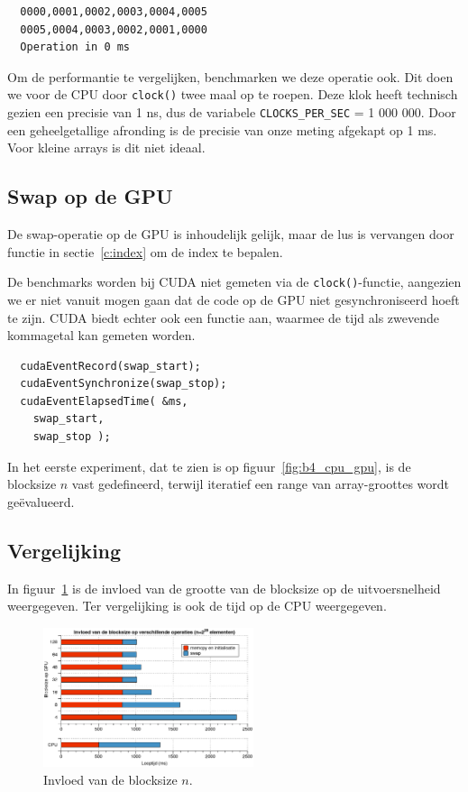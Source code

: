 \documentclass[10pt, twocolumn, a4paper]{article}
\begin{document}
\begin{verbatim}
  0000,0001,0002,0003,0004,0005
  0005,0004,0003,0002,0001,0000 
  Operation in 0 ms
\end{verbatim}

Om de performantie te vergelijken, benchmarken we deze operatie ook. Dit doen we voor de CPU door \texttt{clock()} twee maal op te roepen. Deze klok heeft technisch gezien een precisie van 1 ns, dus de variabele \texttt{CLOCKS_PER_SEC} = 1 000 000. Door een geheelgetallige afronding is de precisie van onze meting afgekapt op 1 ms. Voor kleine arrays is dit niet ideaal.

\subsection{Swap op de GPU}
De swap-operatie op de GPU is inhoudelijk gelijk, maar de lus is vervangen door functie in sectie~\ref{c:index} om de index te bepalen. 

De benchmarks worden bij CUDA niet gemeten via de \texttt{clock()}-functie, aangezien we er niet vanuit mogen gaan dat de code op de GPU niet gesynchroniseerd hoeft te zijn. CUDA biedt echter ook een functie aan, waarmee de tijd als zwevende kommagetal kan gemeten worden. 

\begin{verbatim}
  cudaEventRecord(swap_start);
  cudaEventSynchronize(swap_stop);
  cudaEventElapsedTime( &ms, 
    swap_start, 
    swap_stop );
\end{verbatim}
 



In het eerste experiment, dat te zien is op figuur~\ref{fig:b4_cpu_gpu}, is de blocksize $n$ vast gedefineerd, terwijl iteratief een range van array-groottes wordt ge\"evalueerd. 

\subsection{Vergelijking}
In figuur~\ref{blocksize} is de invloed van de grootte van de blocksize op de uitvoersnelheid weergegeven. Ter vergelijking is ook de tijd op de CPU weergegeven.

\begin{figure}
\centering
\includegraphics[width=0.55\textwidth]{blocksize.eps}
\caption{Invloed van de blocksize $n$.}
\label{blocksize}
\end{figure}
\end{document}
